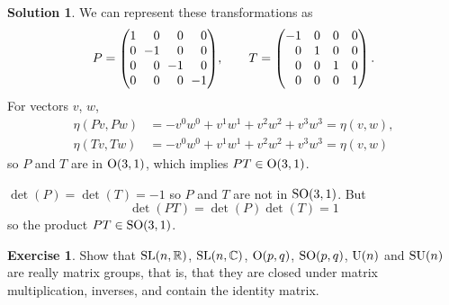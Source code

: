 \documentclass[11pt, a4paper]{report}
\theoremstyle{definition}
\newtheorem{exercise}{Exercise}[part]
\newtheorem{solution}{Solution}[part]
\newenvironment{ex}{\begin{exercise}}{\end{exercise}\pagebreak[1]}
\newenvironment{sol}{\begin{solution}}{\end{solution}\pagebreak[3]}
\newcommand*{\settightmatrix}{\ensuremath\setlength{\arraycolsep}{0.7ex}}
\newenvironment{tightmatrix}
    {\settightmatrix}{}
\newcommand*{\SL}{\ensuremath\text{SL}}
\renewcommand*{\O}{\ensuremath\text{O}}
\newcommand*{\SO}{\ensuremath\text{SO}}
\newcommand*{\U}{\ensuremath\text{U}}
\newcommand*{\SU}{\ensuremath\text{SU}}
\begin{document}
\begin{sol}

We can represent these transformations as
\[
    P = \begin{tightmatrix}\begin{pmatrix*}[r]
            1 & 0  & 0  & 0 \\
            0 & -1 & 0  & 0 \\
            0 & 0  & -1 & 0 \\
            0 & 0  & 0  & -1
        \end{pmatrix*}\end{tightmatrix}, \qquad
    T = \begin{pmatrix*}[r]
            -1 & 0  & 0  & 0 \\
            0  & 1  & 0  & 0 \\
            0  & 0  & 1  & 0 \\
            0  & 0  & 0  & 1
        \end{pmatrix*}.
\]
For vectors $v$, $w$,
\begin{align*}
    \eta(Pv, Pw) &= -v^0 w^0 + v^1 w^1 + v^2 w^2 + v^3 w^3 = \eta(v, w), \\
    \eta(Tv, Tw) &= -v^0 w^0 + v^1 w^1 + v^2 w^2 + v^3 w^3 = \eta(v, w)
\end{align*}
so $P$ and $T$ are in $\O(3, 1)$, which implies $PT \in \O(3, 1)$.

$\det(P) = \det(T) = -1$ so $P$ and $T$ are not in $\SO(3, 1)$. But
\[
    \det(PT) = \det(P) \det(T) = 1
\]
so the product $PT \in \SO(3, 1)$.

\end{sol}

\begin{ex}

Show that $\SL(n, \mathbb{R})$, $\SL(n, \mathbb{C})$, $\O(p, q)$, $\SO(p, q)$, $\U(n)$ and $\SU(n)$ are really matrix groups,
that is, that they are closed under matrix multiplication, inverses, and contain the identity matrix.

\end{ex}
\end{document}
